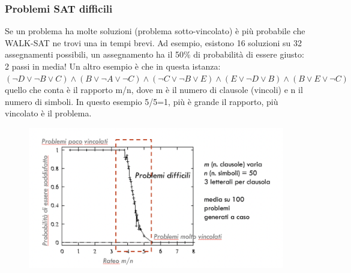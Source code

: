 \documentclass{article}
\begin{document}
\subsubsection{Problemi SAT difficili}
Se un problema ha molte soluzioni (problema sotto-vincolato) è più probabile che WALK-SAT ne trovi una in tempi brevi. Ad esempio, esistono 16 soluzioni su 32 assegnamenti possibili, un assegnamento ha il 50\% di probabilità di essere giusto: 2 passi in media! \newline
Un altro esempio è che in questa istanza: \newline 
$(\neg D \lor \neg B \lor C) \land (B \lor \neg A \lor \neg C) \land (\neg C \lor \neg B \lor E) \land (E \lor \neg D \lor B) \land (B \lor E \lor \neg C)$ \newline quello che conta è il rapporto m/n, dove m è il numero di clausole (vincoli) e n il numero di simboli. In questo esempio 5/5=1, più è grande il rapporto, più vincolato è il problema.
\begin{figure}[h!]
\centering
\includegraphics[scale=0.4]{Images/rateomn.png}
\end{figure}
\end{document}
